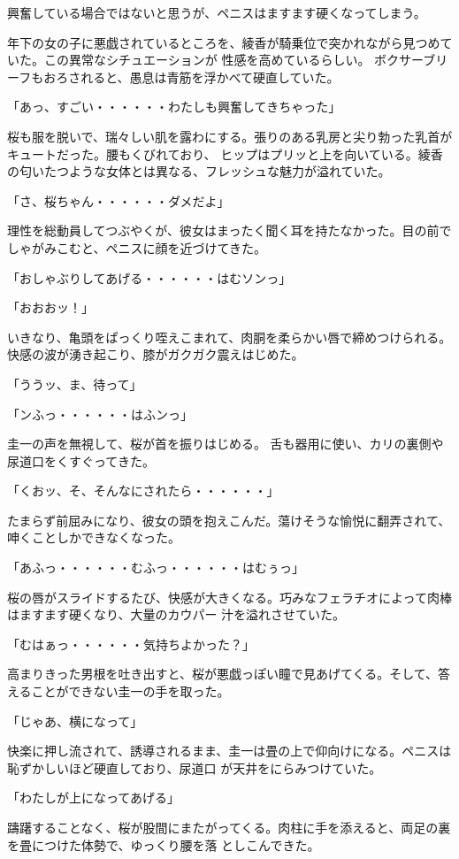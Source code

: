 ﻿\documentclass[book,tate]{jlreq}
\begin{document}
興奮している場合ではないと思うが、ペニスはますます硬くなってしまう。

年下の女の子に悪戯されているところを、綾香が騎乗位で突かれながら見つめていた。この異常なシチュエーションが 性感を高めているらしい。 ボクサーブリーフもおろされると、愚息は青筋を浮かべて硬直していた。

「あっ、すごい・・・・・・わたしも興奮してきちゃった」

桜も服を脱いで、瑞々しい肌を露わにする。張りのある乳房と尖り勃った乳首がキュートだった。腰もくびれており、 ヒップはプリッと上を向いている。綾香の匂いたつような女体とは異なる、フレッシュな魅力が溢れていた。

「さ、桜ちゃん・・・・・・ダメだよ」

理性を総動員してつぶやくが、彼女はまったく聞く耳を持たなかった。目の前でしゃがみこむと、ペニスに顔を近づけてきた。

「おしゃぶりしてあげる・・・・・・はむソンっ」

「おおおッ！」

いきなり、亀頭をぱっくり咥えこまれて、肉胴を柔らかい唇で締めつけられる。快感の波が湧き起こり、膝がガクガク震えはじめた。

「ううッ、ま、待って」

「ンふっ・・・・・・はふンっ」

圭一の声を無視して、桜が首を振りはじめる。 舌も器用に使い、カリの裏側や尿道口をくすぐってきた。

「くおッ、そ、そんなにされたら・・・・・・」

たまらず前屈みになり、彼女の頭を抱えこんだ。蕩けそうな愉悦に翻弄されて、呻くことしかできなくなった。

「あふっ・・・・・・むふっ・・・・・・はむぅっ」

桜の唇がスライドするたび、快感が大きくなる。巧みなフェラチオによって肉棒はますます硬くなり、大量のカウパー 汁を溢れさせていた。

「むはぁっ・・・・・・気持ちよかった？」

高まりきった男根を吐き出すと、桜が悪戯っぽい瞳で見あげてくる。そして、答えることができない圭一の手を取った。

「じゃあ、横になって」

快楽に押し流されて、誘導されるまま、圭一は畳の上で仰向けになる。ペニスは恥ずかしいほど硬直しており、尿道口 が天井をにらみつけていた。

「わたしが上になってあげる」

躊躇することなく、桜が股間にまたがってくる。肉柱に手を添えると、両足の裏を畳につけた体勢で、ゆっくり腰を落 としこんできた。
\end{document}
